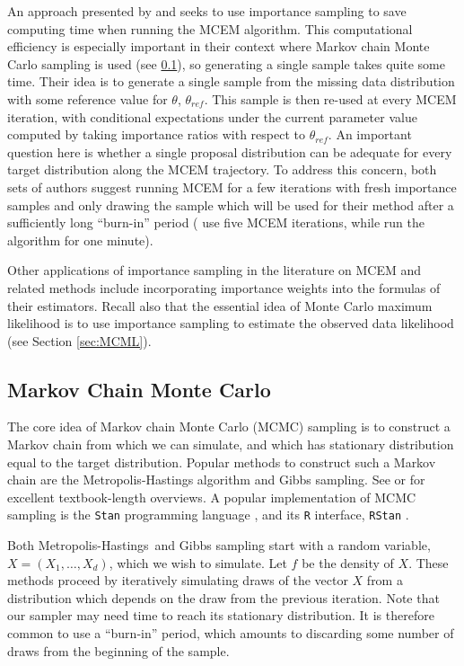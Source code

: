 \documentclass[11pt, oneside]{article}   	%
\newcommand{\mh}{Metropolis-Hastings}
\begin{document}
An approach presented by \citet{Qui99} and \citet{Lev01} seeks to use importance sampling to save computing time when running the MCEM algorithm. This computational efficiency is especially important in their context where Markov chain Monte Carlo sampling is used (see \ref{sec:MCMC}), so generating a single sample takes quite some time. Their idea is to generate a single sample from the missing data distribution with some reference value for $\theta$, $\theta_{ref}$. This sample is then re-used at every MCEM iteration, with conditional expectations under the current parameter value computed by taking importance ratios with respect to $\theta_{ref}$. An important question here is whether a single proposal distribution can be adequate for every target distribution along the MCEM trajectory. To address this concern, both sets of authors suggest running MCEM for a few iterations with fresh importance samples and only drawing the sample which will be used for their method after a sufficiently long ``burn-in'' period (\citeauthor{Qui99} use five MCEM iterations, while \citeauthor{Lev01} run the algorithm for one minute).

Other applications of importance sampling in the literature on MCEM and related methods include \citet{Caf05} incorporating importance weights into the formulas of their estimators. Recall also that the essential idea of Monte Carlo maximum likelihood is to use importance sampling to estimate the observed data likelihood (see Section \ref{sec:MCML}).


\subsection{Markov Chain Monte Carlo}
\label{sec:MCMC}

The core idea of Markov chain Monte Carlo (MCMC) sampling is to construct a Markov chain from which we can simulate, and which has stationary distribution equal to the target distribution. Popular methods to construct such a Markov chain are the Metropolis-Hastings algorithm and Gibbs sampling. See \citet{Gel13} or \citet{Rob04} for excellent textbook-length overviews. A popular implementation of MCMC sampling is the \texttt{Stan} programming language \citep{Sta22}, and its \texttt{R} interface, \texttt{RStan} \citep{Sta23}.

Both \mh\ and Gibbs sampling start with a random variable, $X = (X_1, \ldots, X_d)$, which we wish to simulate. Let $f$ be the density of $X$. These methods proceed by iteratively simulating draws of the vector $X$ from a distribution which depends on the draw from the previous iteration. Note that our sampler may need time to reach its stationary distribution. It is therefore common to use a ``burn-in'' period, which amounts to discarding some number of draws from the beginning of the sample.
\end{document}
